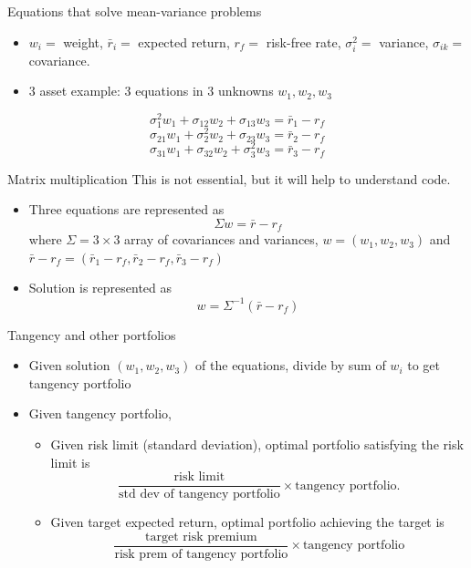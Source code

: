 \documentclass[10pt]{beamer}
\begin{document}
\begin{frame}{Equations that solve mean-variance problems}
\begin{itemize}
\item $w_i=$ weight, $\bar r_i=$ expected return, $r_f=$ risk-free rate, $\sigma_i^2=$ variance, $\sigma_{ik} =$ covariance.
\item 3 asset example: 3 equations in 3 unknowns $w_1, w_2, w_3$
\end{itemize}

$$\sigma_1^2 w_1 + \sigma_{12} w_2 + \sigma_{13}w_3 = \bar r_1 - r_f$$
$$\sigma_{21} w_1 + \sigma_2^2 w_2 + \sigma_{23}w_3 = \bar r_2 - r_f$$
$$\sigma_{31} w_1 + \sigma_{32} w_2 + \sigma_3^2w_3 = \bar r_3 - r_f$$
\end{frame}

\begin{frame}{Matrix multiplication}
    This is not essential, but it will help to understand code.
    \begin{itemize}
    \item Three equations are represented as 
    $$\Sigma w = \bar r - r_f$$
    where $\Sigma = 3 \times 3$ array of covariances and variances, $w=(w_1, w_2, w_3)$ and $\bar r - r_f = (\bar r_1-r_f, \bar r_2 - r_f, \bar r_3 - r_f)$
    \item Solution is represented as 
    $$w = \Sigma^{-1}(\bar r - r_f)$$
    \end{itemize}
    \end{frame}

\begin{frame}{Tangency and other portfolios}
\begin{itemize}
\item Given solution $(w_1, w_2, w_3)$ of the equations, divide by sum of $w_i$ to get tangency portfolio
\item Given tangency portfolio,
\begin{itemize}
    \item Given risk limit (standard deviation), optimal portfolio satisfying the risk limit is
    $$\frac{\text{risk limit}}{\text{std dev of tangency portfolio}} \times \text{tangency portfolio}.$$
    \item Given target expected return, optimal portfolio achieving the target is
    $$\frac{\text{target risk premium}}{\text{risk prem of tangency portfolio}} \times \text{tangency portfolio}$$
    \end{itemize}
\end{itemize}
\end{frame}
\end{document}
